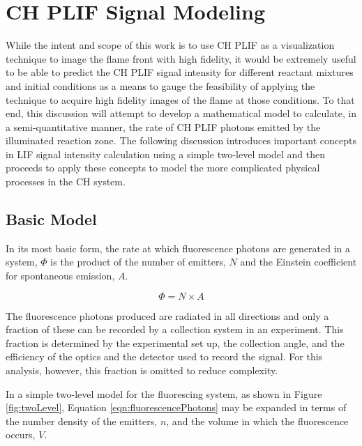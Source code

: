 \section{CH PLIF Signal Modeling}
\label{sec:background-chplif-signal-modeling}

While the intent and scope of this work is to use CH PLIF as a visualization technique to image the flame front with high fidelity, it would be extremely useful to be able to predict the CH PLIF signal intensity for different reactant mixtures and initial conditions as a means to gauge the feasibility of applying the technique to acquire high fidelity images of the flame at those conditions.
To that end, this discussion will attempt to develop a mathematical model to calculate, in a semi-quantitative manner, the rate of CH PLIF photons emitted by the illuminated reaction zone.
The following discussion introduces important concepts in LIF signal intensity calculation using a simple two-level model and then proceeds to apply these concepts to model the more complicated physical processes in the CH system.

\subsection{Basic Model}
\label{subsec:chplif-basic-model}

In its most basic form, the rate at which fluorescence photons are generated in a system, \(\Phi\) is the product of the number of emitters, \(N\) and the Einstein coefficient for spontaneous emission, \(A\).

\begin{equation}
  \Phi = N\times A
  \label{eqn:fluorescencePhotons}
\end{equation}


The fluorescence photons produced are radiated in all directions and only a fraction of these can be recorded by a collection system in an experiment.
This fraction is determined by the experimental set up, the collection angle, and the efficiency of the optics and the detector used to record the signal.
For this analysis, however, this fraction is omitted to reduce complexity.

In a simple two-level model for the fluorescing system, as shown in Figure \ref{fig:twoLevel}, Equation \ref{eqn:fluorescencePhotons} may be expanded in terms of the number density of the emitters, \(n\), and the volume in which the fluorescence occurs, \(V\).


